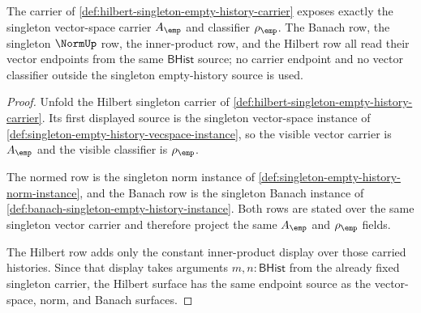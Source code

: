 \begin{theorem}
\label{thm:hilbert-singleton-classifier-source-boundary}
The carrier of
\autoref{def:hilbert-singleton-empty-history-carrier} exposes exactly the
singleton vector-space carrier $A_{\emp}$ and classifier $\rho_{\emp}$. The
Banach row, the singleton $\NormUp$ row, the inner-product row, and the
Hilbert row all read their vector endpoints from the same
$\mathsf{BHist}$ source; no carrier endpoint and no vector classifier outside
the singleton empty-history source is used.
\end{theorem}
\begin{proof}
Unfold the Hilbert singleton carrier of
\autoref{def:hilbert-singleton-empty-history-carrier}. Its first displayed
source is the singleton vector-space instance of
\autoref{def:singleton-empty-history-vecspace-instance}, so the visible vector
carrier is $A_{\emp}$ and the visible classifier is $\rho_{\emp}$.

The normed row is the singleton norm instance of
\autoref{def:singleton-empty-history-norm-instance}, and the Banach row is the
singleton Banach instance of
\autoref{def:banach-singleton-empty-history-instance}. Both rows are stated
over the same singleton vector carrier and therefore project the same
$A_{\emp}$ and $\rho_{\emp}$ fields.

The Hilbert row adds only the constant inner-product display over those
carried histories. Since that display takes arguments
$m,n:\mathsf{BHist}$ from the already fixed singleton carrier, the Hilbert
surface has the same endpoint source as the vector-space, norm, and Banach
surfaces.
\end{proof}


